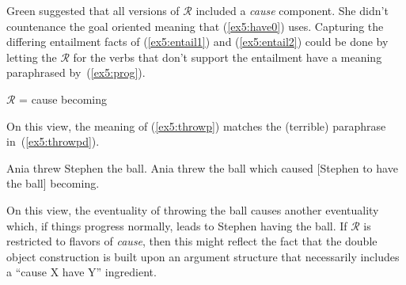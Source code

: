 Green suggested that all versions of $\mathcal{R}$ included a \emph{cause} component. She didn't countenance the goal oriented meaning that (\ref{ex5:have0}) uses. Capturing the differing entailment facts of (\ref{ex5:entail1}) and (\ref{ex5:entail2}) could be done by letting the $\mathcal{R}$ for the verbs that don't support the entailment have a meaning paraphrased by~(\ref{ex5:prog}).%
%
%
\begin{exe}
	\raggedright
	\ex \label{ex5:prog} 
	$\mathcal{R}$ = cause becoming
\end{exe}
On this view, the meaning of (\ref{ex5:throwp}) matches the (terrible) paraphrase in~(\ref{ex5:throwpd}).
\begin{exe}
	\raggedright
	\ex \label{ex5:throwp} 
	Ania threw Stephen the ball.
	\ex \label{ex5:throwpd}
	Ania threw the ball which caused [Stephen to have the ball] becoming.
\end{exe}
On this view, the eventuality of throwing the ball causes another eventuality which, if things progress normally, leads to Stephen having the ball. If $\mathcal{R}$ is restricted to flavors of \emph{cause}, then this might reflect the fact that the double object construction is built upon an argument structure that necessarily includes a ``cause X have Y'' ingredient.

